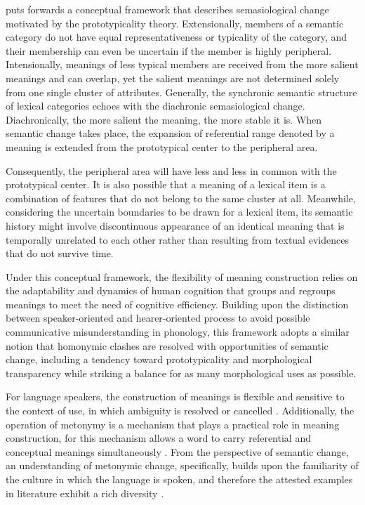 \textcite{geeraerts1997diachronic} puts forwards a conceptual framework that describes semasiological change motivated by the prototypicality theory. Extensionally, members of a semantic category do not have equal representativeness or typicality of the category, and their membership can even be uncertain if the member is highly peripheral. Intensionally, meanings of less typical members are received from the more salient meanings and can overlap, yet the salient meanings are not determined solely from one single cluster of attributes. Generally, the synchronic semantic structure of lexical categories echoes with the diachronic semasiological change. Diachronically, the more salient the meaning, the more stable it is. When semantic change takes place, the expansion of referential range denoted by a meaning is extended from the prototypical center to the peripheral area.

Consequently, the peripheral area will have less and less in common with the prototypical center. It is also possible that a meaning of a lexical item is a combination of features that do not belong to the same cluster at all. Meanwhile, considering the uncertain boundaries to be drawn for a lexical item, its semantic history might involve discontinuous appearance of an identical meaning that is temporally unrelated to each other rather than resulting from textual evidences that do not survive time.

Under this conceptual framework, the flexibility of meaning construction relies on the adaptability and dynamics of human cognition that groups and regroups meanings to meet the need of cognitive efficiency. Building upon the distinction between speaker-oriented and hearer-oriented process to avoid possible communicative misunderstanding in phonology, this framework adopts a similar notion that homonymic clashes are resolved with opportunities of semantic change, including a tendency toward prototypicality and morphological transparency while striking a balance for as many morphological uses as possible.

For language speakers, the construction of meanings is flexible and sensitive to the context of use, in which ambiguity is resolved or cancelled \parencite{miller1991contextual,harris1954distributional}. Additionally, the operation of metonymy is a mechanism that plays a practical role in meaning construction, for this mechanism allows a word to carry referential and conceptual meanings simultaneously \parencite{hilpert2019historical,nerlich2001serial}. From the perspective of semantic change, an understanding of metonymic change, specifically, builds upon the familiarity of the culture in which the language is spoken, and therefore the attested examples in literature exhibit a rich diversity \parencite[649]{fortson2017approach}.

